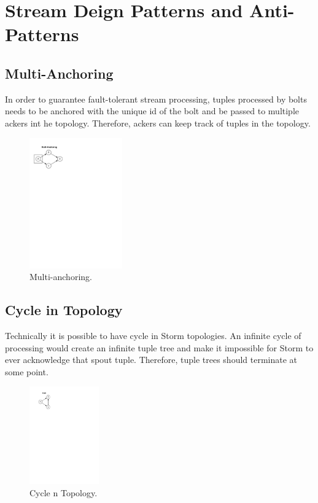 \section{Stream Deign Patterns and Anti-Patterns}
\label{sec:anti-pattern}

\subsection{Multi-Anchoring}
In order to guarantee fault-tolerant stream processing, tuples processed by bolts needs to be anchored with the unique id of the bolt and be passed to multiple ackers int he topology. Therefore, ackers can keep track of tuples in the topology.

\begin{figure}[h!]
	\begin{center}
		\includegraphics[width=4cm]{images/multi-anchoring}
		\caption{Multi-anchoring.}
		\label{fig:multi-anchoring}
	\end{center}
\end{figure}

\subsection{Cycle in Topology}

Technically it is possible to have cycle in Storm topologies. An infinite cycle of processing would create an infinite tuple tree and make it impossible for Storm to ever acknowledge that spout tuple. Therefore,  tuple trees should terminate at some point.

\begin{figure}[h!]
	\begin{center}
		\includegraphics[width=3cm]{images/cycle}
		\caption{Cycle n Topology.}
		\label{fig:cycle}
	\end{center}
\end{figure}

